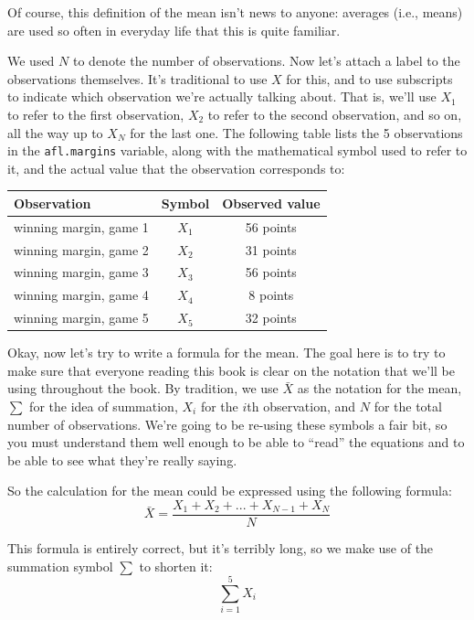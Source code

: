 \documentclass[
  11pt,
]{book}
\theoremstyle{definition}
\theoremstyle{definition}
\theoremstyle{definition}
\theoremstyle{definition}
\theoremstyle{remark}
\begin{document}
Of course, this definition of the mean isn't news to anyone: averages (i.e., means) are used so often in everyday life that this is quite familiar.

We used \(N\) to denote the number of observations. Now let's attach a label to the observations themselves. It's traditional to use \(X\) for this, and to use subscripts to indicate which observation we're actually talking about. That is, we'll use \(X_1\) to refer to the first observation, \(X_2\) to refer to the second observation, and so on, all the way up to \(X_N\) for the last one. The following table lists the 5 observations in the \texttt{afl.margins} variable, along with the mathematical symbol used to refer to it, and the actual value that the observation corresponds to:

\begin{table}[H]
\centering
\begin{tabular}{lcc}
\toprule
Observation & Symbol & Observed value\\
\midrule
winning margin, game 1 & $X_1$ & 56 points\\
winning margin, game 2 & $X_2$ & 31 points\\
winning margin, game 3 & $X_3$ & 56 points\\
winning margin, game 4 & $X_4$ & 8 points\\
winning margin, game 5 & $X_5$ & 32 points\\
\bottomrule
\end{tabular}
\end{table}

Okay, now let's try to write a formula for the mean. The goal here is to try to make sure that everyone reading this book is clear on the notation that we'll be using throughout the book. By tradition, we use \(\bar{X}\) as the notation for the mean, \(\scriptstyle\sum\) for the idea of summation, \(X_i\) for the \(i\)th observation, and \(N\) for the total number of observations. We're going to be re-using these symbols a fair bit, so you must understand them well enough to be able to ``read'' the equations and to be able to see what they're really saying.

So the calculation for the mean could be expressed using the following formula:
\[
\bar{X} = \frac{X_1 + X_2 + ... + X_{N-1} + X_N}{N}
\]

This formula is entirely correct, but it's terribly long, so we make use of the summation symbol \(\scriptstyle\sum\) to shorten it:
\[
\sum_{i=1}^5 X_i
\]
\end{document}
